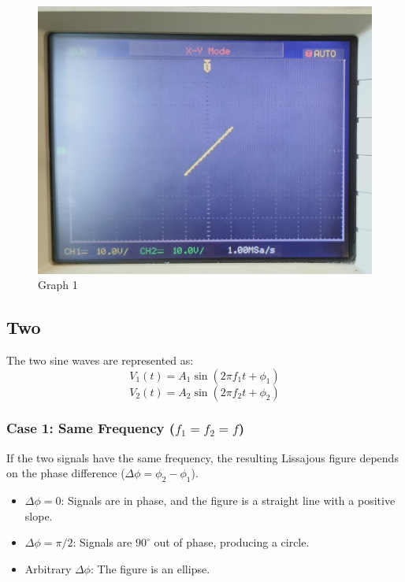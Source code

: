 \documentclass[12pt,a4paper]{report}
\begin{document}
\begin{figure}[H]
\begin{minipage}[c]{0.48\textwidth}
    \end{minipage}
    \hfill
    \begin{minipage}[c]{0.48\textwidth}
        \includegraphics[width=\textwidth]{figs/1cro.jpg} %
        
    \end{minipage}
    \caption{Graph 1}
    \label{fig:CRO-patterns}
\end{figure}
\subsection{Two}
The two sine waves are represented as:
\[
V_1(t) = A_1 \sin(2 \pi f_1 t + \phi_1)
\]
\[
V_2(t) = A_2 \sin(2 \pi f_2 t + \phi_2)
\]

\subsubsection*{Case 1: Same Frequency (\(f_1 = f_2 = f\))}
If the two signals have the same frequency, the resulting Lissajous figure depends on the phase difference (\( \Delta \phi = \phi_2 - \phi_1 \)).

\begin{itemize}
    \item \(\Delta \phi = 0\): Signals are in phase, and the figure is a straight line with a positive slope.
    \item \(\Delta \phi = \pi/2\): Signals are \(90^\circ\) out of phase, producing a circle.
    \item Arbitrary \(\Delta \phi\): The figure is an ellipse.
\end{itemize}
\end{document}
